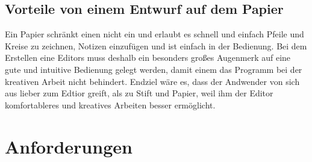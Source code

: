\documentclass[11pt]{article}
\begin{document}
\subsection{Vorteile von einem Entwurf auf dem Papier}
\label{sec:orgheadline6}
Ein Papier schränkt einen nicht ein und erlaubt es schnell und einfach Pfeile
und Kreise zu zeichnen, Notizen einzufügen und ist einfach in der Bedienung.
Bei dem Erstellen eine Editors muss deshalb ein besonders großes Augenmerk auf
eine gute und intuitive Bedienung gelegt werden, damit einem das Programm bei der kreativen Arbeit nicht
behindert. Endziel wäre es, dass der Andwender von sich aus lieber zum Edtior
greift, als zu Stift und Papier, weil ihm der Editor komfortableres und
kreatives Arbeiten besser ermöglicht.

\section{Anforderungen}
\label{sec:orgheadline14}
\end{document}
